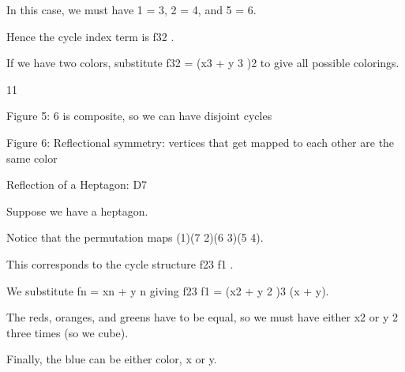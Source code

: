 \documentclass[a4paper,portrait,12pt]{article}
\begin{document}
\begin{flushleft}
In this case, we must have 1 = 3, 2 = 4, and 5 = 6.
\end{flushleft}


\begin{flushleft}
Hence the cycle index term is f32 .
\end{flushleft}


\begin{flushleft}
If we have two colors, substitute f32 = (x3 + y 3 )2 to give all possible colorings.
\end{flushleft}


11





\begin{flushleft}
\newpage
Figure 5: 6 is composite, so we can have disjoint cycles
\end{flushleft}





\begin{flushleft}
Figure 6: Reflectional symmetry: vertices that get mapped to each other are the same color
\end{flushleft}


\begin{flushleft}
Reflection of a Heptagon: D7
\end{flushleft}


\begin{flushleft}
Suppose we have a heptagon.
\end{flushleft}


\begin{flushleft}
Notice that the permutation maps (1)(7 2)(6 3)(5 4).
\end{flushleft}


\begin{flushleft}
This corresponds to the cycle structure f23 f1 .
\end{flushleft}


\begin{flushleft}
We substitute fn = xn + y n giving f23 f1 = (x2 + y 2 )3 (x + y).
\end{flushleft}


\begin{flushleft}
The reds, oranges, and greens have to be equal, so we must have either x2 or y 2 three times (so we cube).
\end{flushleft}


\begin{flushleft}
Finally, the blue can be either color, x or y.
\end{flushleft}
\end{document}
